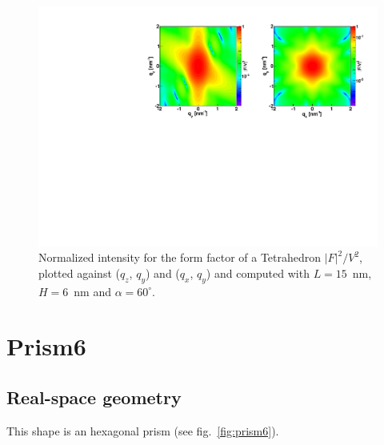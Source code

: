 \begin{figure}[h]
\begin{center}
\includegraphics[width=\textwidth]{Figures/figfftetrahedron}
\end{center}
\caption{Normalized intensity for the form factor of a Tetrahedron
  $|F|^2/V^2$, plotted against ($q_z$, $q_y$) and  ($q_x$, $q_y$) and
  computed with $L=15$~nm, $H=6$~nm and $\alpha=60^{\circ}$.}
\label{fig:FFtetrahEx}
\end{figure}

\FloatBarrier


\newpage{\cleardoublepage}
\section{Prism6} 

\subsection{Real-space geometry}
This shape is an hexagonal prism (see fig.~\ref{fig:prism6}).

